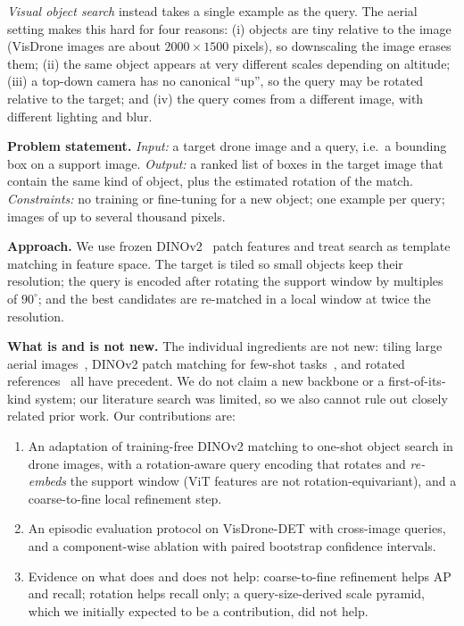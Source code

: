 \documentclass[10pt,twocolumn,letterpaper]{article}
\begin{document}
\emph{Visual object search} instead takes a single example as the query. The aerial setting makes this hard for four reasons: (i) objects are tiny relative to the image (VisDrone images are about $2000\times1500$ pixels), so downscaling the image erases them; (ii) the same object appears at very different scales depending on altitude; (iii) a top-down camera has no canonical ``up'', so the query may be rotated relative to the target; and (iv) the query comes from a different image, with different lighting and blur.

\noindent\textbf{Problem statement.} \emph{Input:} a target drone image and a query, i.e.\ a bounding box on a support image. \emph{Output:} a ranked list of boxes in the target image that contain the same kind of object, plus the estimated rotation of the match. \emph{Constraints:} no training or fine-tuning for a new object; one example per query; images of up to several thousand pixels.

\noindent\textbf{Approach.} We use frozen DINOv2~\cite{oquab2023dinov2} patch features and treat search as template matching in feature space. The target is tiled so small objects keep their resolution; the query is encoded after rotating the support window by multiples of $90^\circ$; and the best candidates are re-matched in a local window at twice the resolution.

\noindent\textbf{What is and is not new.} The individual ingredients are not new: tiling large aerial images~\cite{akyon2022sahi,xie2022fewer}, DINOv2 patch matching for few-shot tasks~\cite{bou2024fewshot,damm2025anomalydino,espinosa2025notime}, and rotated references~\cite{damm2025anomalydino} all have precedent. We do not claim a new backbone or a first-of-its-kind system; our literature search was limited, so we also cannot rule out closely related prior work. Our contributions are:
\begin{enumerate}
  \item An adaptation of training-free DINOv2 matching to one-shot object search in drone images, with a rotation-aware query encoding that rotates and \emph{re-embeds} the support window (ViT features are not rotation-equivariant), and a coarse-to-fine local refinement step.
  \item An episodic evaluation protocol on VisDrone-DET with cross-image queries, and a component-wise ablation with paired bootstrap confidence intervals.
  \item Evidence on what does and does not help: coarse-to-fine refinement helps AP and recall; rotation helps recall only; a query-size-derived scale pyramid, which we initially expected to be a contribution, did not help.
\end{enumerate}
\end{document}
